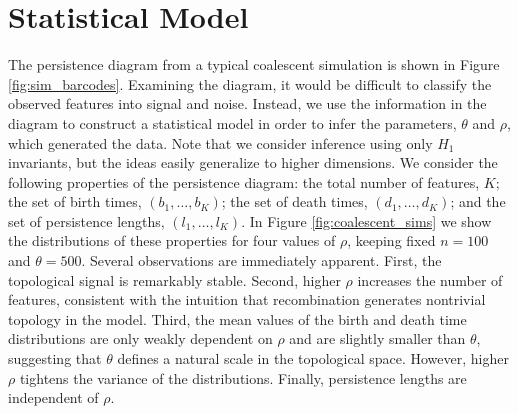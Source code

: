 \section{Statistical Model}
\label{sec:model}

The persistence diagram from a typical coalescent simulation is shown in Figure \ref{fig:sim_barcodes}.
Examining the diagram, it would be difficult to classify the observed features into signal and noise.
Instead, we use the information in the diagram to construct a statistical model in order to infer the parameters, $\theta$ and $\rho$, which generated the data.
Note that we consider inference using only $H_1$ invariants, but the ideas easily generalize to higher dimensions.
We consider the following properties of the persistence diagram: the total number of features, $K$; the set of birth times, $(b_1,{\ldots},b_K)$; the set of death times, $(d_1,{\ldots},d_K)$; and the set of persistence lengths, $(l_1,{\ldots},l_K)$.
In Figure \ref{fig:coalescent_sims} we show the distributions of these properties for four values of $\rho$, keeping fixed $n=100$ and $\theta=500$.
Several observations are immediately apparent.
First, the topological signal is remarkably stable.
Second, higher $\rho$ increases the number of features, consistent with the intuition that recombination generates nontrivial topology in the model.
Third, the mean values of the birth and death time distributions are only weakly dependent on $\rho$ and are slightly smaller than $\theta$, suggesting that $\theta$ defines a natural scale in the topological space.
However, higher $\rho$ tightens the variance of the distributions.
Finally, persistence lengths are independent of $\rho$.

